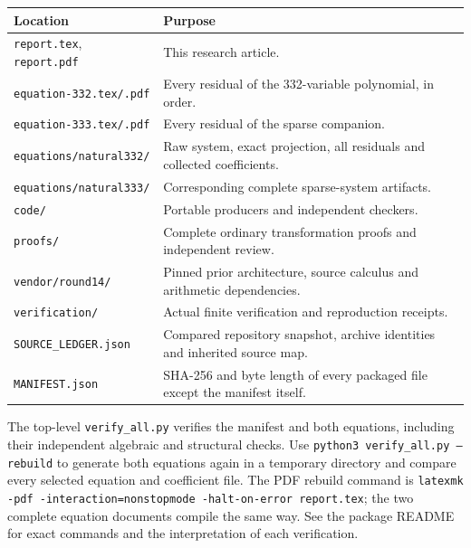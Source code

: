 \documentclass[11pt,letterpaper]{article}
\theoremstyle{remark}\newtheorem{remark}[theorem]{Remark}
\begin{document}
\begin{center}
\begin{tabular}{@{}p{}p{}@{}}\toprule
Location & Purpose\\\midrule
\texttt{report.tex}, \texttt{report.pdf} & This research article.\\
\texttt{equation-332.tex/.pdf} & Every residual of the 332-variable polynomial, in order.\\
\texttt{equation-333.tex/.pdf} & Every residual of the sparse companion.\\
\texttt{equations/natural332/} & Raw system, exact projection, all residuals and collected coefficients.\\
\texttt{equations/natural333/} & Corresponding complete sparse-system artifacts.\\
\texttt{code/} & Portable producers and independent checkers.\\
\texttt{proofs/} & Complete ordinary transformation proofs and independent review.\\
\texttt{vendor/round14/} & Pinned prior architecture, source calculus and arithmetic dependencies.\\
\texttt{verification/} & Actual finite verification and reproduction receipts.\\
\texttt{SOURCE\_LEDGER.json} & Compared repository snapshot, archive identities and inherited source map.\\
\texttt{MANIFEST.json} & SHA-256 and byte length of every packaged file except the manifest itself.\\\bottomrule
\end{tabular}
\end{center}

The top-level \texttt{verify\_all.py} verifies the manifest and both
equations, including their independent algebraic and structural checks.
Use \texttt{python3 verify\_all.py --rebuild} to generate both equations
again in a temporary directory and compare every selected equation and
coefficient file. The PDF rebuild command is
\texttt{latexmk -pdf -interaction=nonstopmode -halt-on-error report.tex};
the two complete equation documents compile the same way. See the package
README for exact commands and the interpretation of each verification.
\end{document}
